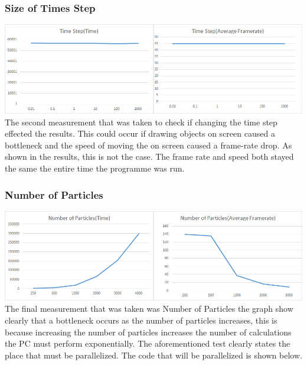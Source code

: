 \documentclass[12pt]{article}
\begin{document}
\subsubsection{Size of Times Step}
\includegraphics[scale=0.5]{pics/iatime.png}
\newline
The second measurement that was taken to check if changing the time step effected the results. This could occur if drawing objects on screen caused a bottleneck and the speed of moving the on screen caused a frame-rate drop. As shown in the results, this is not the case. The frame rate and speed both stayed the same the entire time the programme was run.
\subsubsection{ Number of Particles}
\includegraphics[scale=0.5]{pics/ianumber.png}
\newline
The final measurement that was taken was Number of Particles the graph show clearly that a bottleneck occurs as the number of particles increases, this is because increasing the number of particles increases the number of calculations the PC must perform exponentially. The aforementioned test clearly states the place that must be parallelized. The code that will be parallelized is shown below.

	
\end{document}
